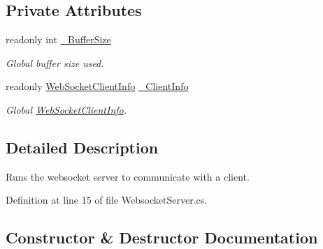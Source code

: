 \subsection*{Private Attributes}
\begin{DoxyCompactItemize}
\item 
readonly int \mbox{\hyperlink{class_simple_web_socket_server_library_1_1_w_socket_server_1_1_web_socket_server_a6d5baef80e87cbb0f7b6588498ea33c0}{\+\_\+\+Buffer\+Size}}
\begin{DoxyCompactList}\small\item\em Global buffer size used. \end{DoxyCompactList}\item 
readonly \mbox{\hyperlink{class_simple_web_socket_server_library_1_1_web_socket_client_info}{Web\+Socket\+Client\+Info}} \mbox{\hyperlink{class_simple_web_socket_server_library_1_1_w_socket_server_1_1_web_socket_server_a43967b2701368bc8a17258f14e22707b}{\+\_\+\+Client\+Info}}
\begin{DoxyCompactList}\small\item\em Global \mbox{\hyperlink{class_simple_web_socket_server_library_1_1_web_socket_client_info}{Web\+Socket\+Client\+Info}}. \end{DoxyCompactList}\end{DoxyCompactItemize}


\subsection{Detailed Description}
Runs the websocket server to communicate with a client. 



Definition at line 15 of file Websocket\+Server.\+cs.



\subsection{Constructor \& Destructor Documentation}
\mbox{\label{class_simple_web_socket_server_library_1_1_w_socket_server_1_1_web_socket_server_a4162571a5f4e62f103082ed52cba9566}} 
